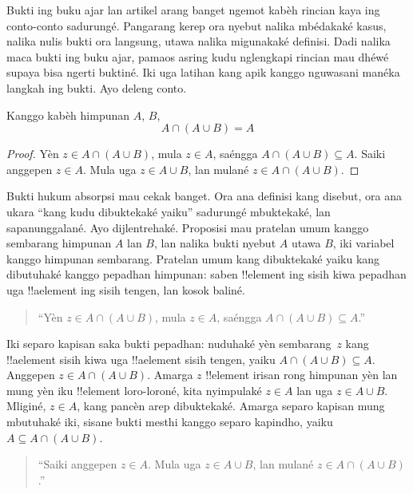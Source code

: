 \documentclass[../../../include/open-logic-section]{subfiles}
\begin{document}

Bukti ing buku ajar lan artikel arang banget ngemot kabèh
rincian kaya ing conto-conto sadurungé. Pangarang kerep ora
nyebut nalika mbédakaké kasus, nalika nulis bukti ora langsung,
utawa nalika migunakaké definisi. Dadi nalika maca bukti ing
buku ajar, pamaos asring kudu nglengkapi rincian mau
dhéwé supaya bisa ngerti buktiné. Iki uga latihan kang apik
kanggo nguwasani manéka langkah ing bukti. Ayo deleng conto.

\begin{prop}[Absorpsi]
Kanggo kabèh himpunan $A$, $B$,
\[
A \cap (A \cup B) = A
\]
\end{prop}

\begin{proof}
Yèn $z \in A \cap (A \cup B)$, mula $z \in A$, saéngga
$A \cap (A \cup B) \subseteq A$. Saiki anggepen $z \in A$.
Mula uga $z \in A \cup B$, lan mulané
$z \in A \cap (A \cup B)$.
\end{proof}

Bukti hukum absorpsi mau cekak banget. Ora ana definisi
kang disebut, ora ana ukara ``kang kudu dibuktekaké yaiku''
sadurungé mbuktekaké, lan sapanunggalané. Ayo dijlentrehaké.
Proposisi mau pratelan umum kanggo sembarang himpunan $A$ lan
$B$, lan nalika bukti nyebut $A$ utawa $B$, iki variabel
kanggo himpunan sembarang. Pratelan umum kang dibuktekaké
yaiku kang dibutuhaké kanggo pepadhan himpunan: saben
!!{element} ing sisih kiwa pepadhan uga !!a{element}
ing sisih tengen, lan kosok baliné.

\begin{quote}
``Yèn $z \in A \cap (A \cup B)$, mula $z \in A$, saéngga
  $A \cap (A \cup B) \subseteq A$.''
\end{quote}

Iki separo kapisan saka bukti pepadhan: nuduhaké yèn
sembarang~$z$ kang !!a{element} sisih kiwa uga
!!a{element} sisih tengen, yaiku
$A \cap (A \cup B) \subseteq A$.
Anggepen $z \in A \cap (A \cup B)$. Amarga $z$
!!{element} irisan rong himpunan yèn lan mung yèn
iku !!{element} loro-loroné, kita nyimpulaké
$z \in A$ lan uga $z \in A \cup B$.
Mliginé, $z \in A$, kang pancèn arep dibuktekaké.
Amarga separo kapisan mung mbutuhaké iki, sisane
bukti mesthi kanggo separo kapindho, yaiku
$A \subseteq A \cap
(A \cup B)$.

\begin{quote}
``Saiki anggepen $z \in A$. Mula uga $z \in A \cup B$, lan
mulané $z \in A \cap (A \cup B)$.''
\end{quote}
\end{document}

